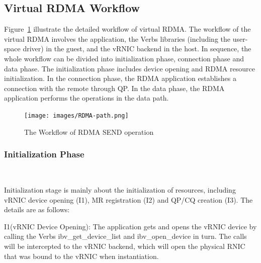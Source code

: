\subsection{Virtual RDMA Workflow}


Figure~\ref{fig:rdma-path} illustrate the detailed workflow of virtual RDMA. The workflow of the virtual RDMA involves the application, the Verbs libraries (including the user-space driver) in the guest, and the vRNIC backend in the host. In sequence, the whole workflow can be divided into initialization phase, connection phase and data phase. The initialization phase includes device opening and RDMA resource initialization. In the connection phase, the RDMA application establishes a connection with the remote through QP. In the data phase, the RDMA application performs the operations in the data path.

\begin{figure}[!ht]
	\centering
	\texttt{[image: images/RDMA-path.png]}
	\caption{The Workflow of RDMA SEND operation}
	\label{fig:rdma-path}
\end{figure}

\subsubsection{\textbf{Initialization Phase}}
\
\noindent

Initialization stage is mainly about the initialization of resources, including vRNIC device opening (I1), MR registration (I2) and QP/CQ creation (I3). The details are as follows:


I1(vRNIC Device Opening): The application gets and opens the vRNIC device by calling the Verbs ibv\_get\_device\_list and ibv\_open\_device in turn. The calls will be intercepted to the vRNIC backend, which will open the physical RNIC that was bound to the vRNIC when instantiation.

